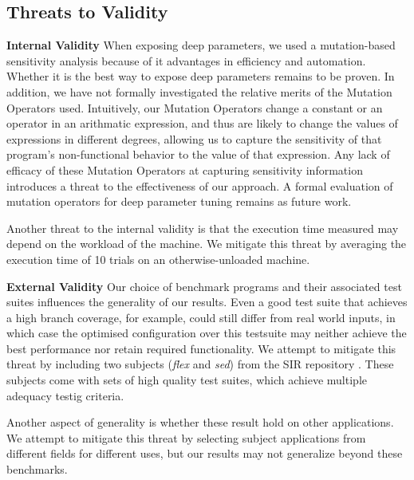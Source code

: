 \subsection{Threats to Validity}

\textbf{Internal Validity}  When exposing deep parameters, we used a mutation-based sensitivity analysis because of it advantages in efficiency and automation. Whether it is the best way to expose deep parameters remains to be proven. In addition, we have not formally investigated the relative merits of the Mutation Operators used. Intuitively, our Mutation Operators change a constant or an operator in an arithmatic expression, and thus are likely to change the values of expressions in different degrees, allowing us to capture the sensitivity of that program's non-functional behavior to the value of that expression. Any lack of efficacy of these Mutation Operators at capturing sensitivity information introduces a threat to the effectiveness of our approach. A formal evaluation of mutation operators for deep parameter tuning remains as future work.

Another threat to the internal validity is that the execution time measured
may depend on the workload of the machine. We mitigate this threat by
 averaging the execution time of 10 trials on an otherwise-unloaded machine. 

\textbf{External Validity}  Our choice of benchmark programs and their
associated test suites influences the generality of our results. 
Even a good test suite that achieves a high branch coverage, for
example, could still differ from real world
inputs, in which case the optimised configuration over this testsuite may
neither achieve the best performance nor retain required functionality.
We attempt to mitigate this threat by including two subjects (\emph{flex} and \emph{sed})
from the SIR repository \cite{SIR2005}. These subjects come with
sets of high quality test suites, which achieve multiple adequacy 
testig criteria.

Another aspect of generality is whether these result hold on other
applications. We attempt to mitigate this threat by selecting subject
applications from different fields for different uses, but our results
may not generalize beyond these benchmarks. 
